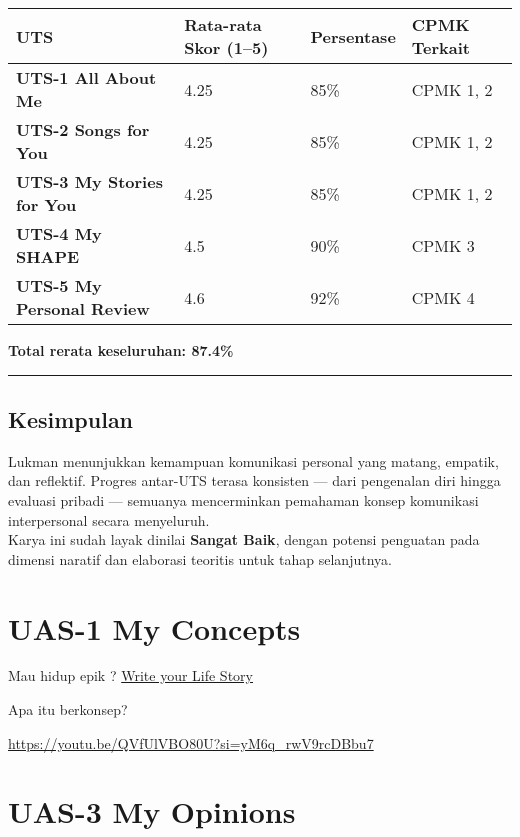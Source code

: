 \documentclass[
  letterpaper,
  DIV=11,
  numbers=noendperiod]{scrreprt}
\begin{document}
\begin{longtable}[]{@{}llll@{}}
\toprule\noalign{}
UTS & Rata-rata Skor (1--5) & Persentase & CPMK Terkait \\
\midrule\noalign{}
\endhead
\bottomrule\noalign{}
\endlastfoot
\textbf{UTS-1 All About Me} & 4.25 & 85\% & CPMK 1, 2 \\
\textbf{UTS-2 Songs for You} & 4.25 & 85\% & CPMK 1, 2 \\
\textbf{UTS-3 My Stories for You} & 4.25 & 85\% & CPMK 1, 2 \\
\textbf{UTS-4 My SHAPE} & 4.5 & 90\% & CPMK 3 \\
\textbf{UTS-5 My Personal Review} & 4.6 & 92\% & CPMK 4 \\
\end{longtable}

\textbf{Total rerata keseluruhan: 87.4\%}

\begin{center}\rule{0.5\linewidth}{0.5pt}\end{center}

\section{Kesimpulan}\label{kesimpulan}

Lukman menunjukkan kemampuan komunikasi personal yang matang, empatik,
dan reflektif. Progres antar-UTS terasa konsisten --- dari pengenalan
diri hingga evaluasi pribadi --- semuanya mencerminkan pemahaman konsep
komunikasi interpersonal secara menyeluruh.\\
Karya ini sudah layak dinilai \textbf{Sangat Baik}, dengan potensi
penguatan pada dimensi naratif dan elaborasi teoritis untuk tahap
selanjutnya.


\chapter{UAS-1 My Concepts}\label{uas-1-my-concepts}

Mau hidup epik ? \href{lifestory.pdf}{Write your Life Story}

Apa itu berkonsep?

\url{https://youtu.be/QVfUlVBO80U?si=yM6q_rwV9rcDBbu7}


\chapter{UAS-3 My Opinions}\label{uas-3-my-opinions}
\end{document}
